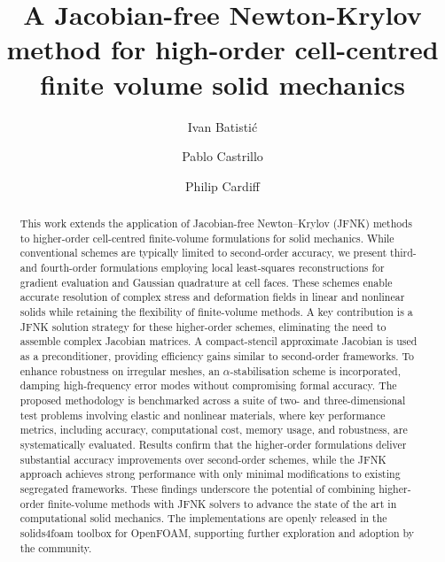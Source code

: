 \documentclass[review,3p]{elsarticle}
\begin{document}
\begin{frontmatter}



\title{A Jacobian-free Newton-Krylov method for high-order cell-centred finite volume solid mechanics}


\author[UCD,UZ]{Ivan Batisti{\'c}}

\author[UCD,IET]{Pablo Castrillo}

\author[UCD]{Philip Cardiff}

\address[UCD]{School of Mechanical and Materials Engineering, University College Dublin, Belfield, D04 V1W8, Ireland}

\address[UZ]{School of Mechanical and Materials Engineering, University of Zagreb, Ivana Lu\v{c}i{\'c}a 5, 10000 Zagreb, Croatia}

\address[IET]{Instituto de Estructuras y Transporte, Facultad de Ingenier{\'i}a, Universidad de la Rep{\'u}blica, Julio Herrera Y Reissig 565, 11300 Montevideo, Uruguay}


\begin{abstract}
This work extends the application of Jacobian-free Newton–Krylov (JFNK) methods to higher-order cell-centred finite-volume formulations for solid mechanics. While conventional schemes are typically limited to second-order accuracy, we present third- and fourth-order formulations employing local least-squares reconstructions for gradient evaluation and Gaussian quadrature at cell faces. These schemes enable accurate resolution of complex stress and deformation fields in linear and nonlinear solids while retaining the flexibility of finite-volume methods.
%
A key contribution is a JFNK solution strategy for these higher-order schemes, eliminating the need to assemble complex Jacobian matrices. A compact-stencil approximate Jacobian is used as a preconditioner, providing efficiency gains similar to second-order frameworks. To enhance robustness on irregular meshes, an $\alpha$-stabilisation scheme is incorporated, damping high-frequency error modes without compromising formal accuracy.
%
The proposed methodology is benchmarked across a suite of two- and three-dimensional test problems involving elastic and nonlinear materials, where key performance metrics, including accuracy, computational cost, memory usage, and robustness, are systematically evaluated.
Results confirm that the higher-order formulations deliver substantial accuracy improvements over second-order schemes, while the JFNK approach achieves strong performance with only minimal modifications to existing segregated frameworks.
%
These findings underscore the potential of combining higher-order finite-volume methods with JFNK solvers to advance the state of the art in computational solid mechanics.
%
The implementations are openly released in the solids4foam toolbox for OpenFOAM, supporting further exploration and adoption by the community.
\end{abstract}


\end{frontmatter}
\end{document}
